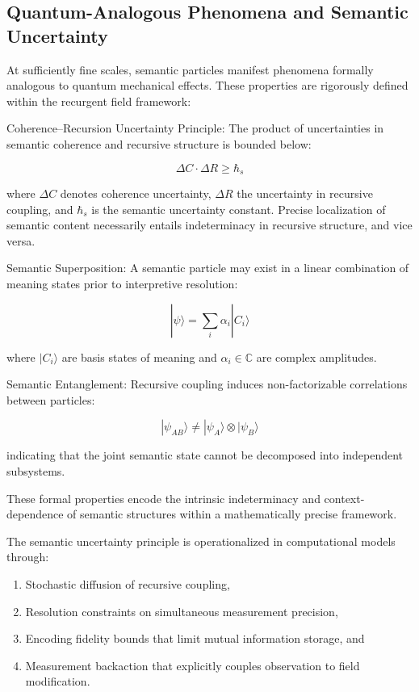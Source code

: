 \subsection{Quantum-Analogous Phenomena and Semantic Uncertainty}

At sufficiently fine scales, semantic particles manifest phenomena formally analogous to quantum mechanical effects. These properties are rigorously defined within the recurgent field framework:

Coherence–Recursion Uncertainty Principle: The product of uncertainties in semantic coherence and recursive structure is bounded below:

\begin{equation}
\Delta C \cdot \Delta R \geq \hbar_s
\end{equation}

where \(\Delta C\) denotes coherence uncertainty, \(\Delta R\) the uncertainty in recursive coupling, and \(\hbar_s\) is the semantic uncertainty constant. Precise localization of semantic content necessarily entails indeterminacy in recursive structure, and vice versa.

Semantic Superposition: A semantic particle may exist in a linear combination of meaning states prior to interpretive resolution:

\begin{equation}
|\psi\rangle = \sum_i \alpha_i |C_i\rangle
\end{equation}

where \(|C_i\rangle\) are basis states of meaning and \(\alpha_i \in \mathbb{C}\) are complex amplitudes.

Semantic Entanglement: Recursive coupling induces non-factorizable correlations between particles:

\begin{equation}
|\psi_{AB}\rangle \neq |\psi_A\rangle \otimes |\psi_B\rangle
\end{equation}

indicating that the joint semantic state cannot be decomposed into independent subsystems.

These formal properties encode the intrinsic indeterminacy and context-dependence of semantic structures within a mathematically precise framework.

The semantic uncertainty principle is operationalized in computational models through:

\begin{enumerate}
    \item Stochastic diffusion of recursive coupling,
    \item Resolution constraints on simultaneous measurement precision,
    \item Encoding fidelity bounds that limit mutual information storage, and
    \item Measurement backaction that explicitly couples observation to field modification.
\end{enumerate}

